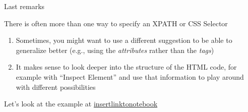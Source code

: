 \begin{frame}{Last remarks}
  \begin{block}{There is often more than one way to specify an XPATH or CSS Selector}
    \begin{enumerate}
    \item Sometimes, you might want to use a different suggestion to be able to generalize better (e.g., using the \emph{attributes} rather than the \emph{tags})
    \item It makes sense to look deeper into the structure of the HTML code, for example with ``Inspect Element'' and use that information to play around with different possibilities
    \end{enumerate}
  \end{block}
\end{frame}



\begin{frame}[standout]
Let's look at the example at \url{insertlinktonotebook}

\end{frame}
